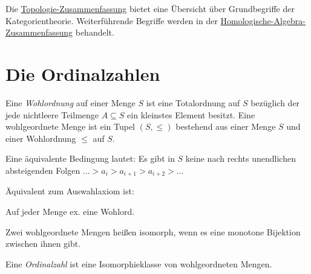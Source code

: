 \documentclass{cheat-sheet}
\begin{document}

\begin{bem}
  Die \href{http://timbaumann.info/uni-spicker/topo.pdf}{Topologie-Zusammenfassung} bietet eine Übersicht über Grundbegriffe der Kategorientheorie. Weiterführende Begriffe werden in der \href{http://timbaumann.info/uni-spicker/homoalg.pdf}{Homologische-Algebra-Zusammenfassung} behandelt.
\end{bem}


\section{Die Ordinalzahlen}

\begin{defn}
  Eine \emph{Wohlordnung} auf einer Menge $S$ ist eine Totalordnung auf $S$ bezüglich der jede nichtleere Teilmenge $A \subseteq S$ ein kleinstes Element besitzt. Eine wohlgeordnete Menge ist ein Tupel $(S, \leq)$ bestehend aus einer Menge $S$ und einer Wohlordnung $\leq$ auf $S$.
\end{defn}

\begin{bem}
  Eine äquivalente Bedingung lautet: Es gibt in $S$ keine nach rechts unendlichen absteigenden Folgen
  $\ldots > a_i > a_{i+1} > a_{i+2} > \ldots$
\end{bem}

\begin{bem}
  Äquivalent zum Auswahlaxiom ist:
\end{bem}

\begin{axiom}[Wohlordnungssatz]
  Auf jeder Menge ex. eine Wohlord.
\end{axiom}

\begin{defn}
  Zwei wohlgeordnete Mengen heißen isomorph, wenn es eine monotone Bijektion zwischen ihnen gibt.
\end{defn}


\begin{defn}
  Eine \emph{Ordinalzahl} ist eine Isomorphieklasse von wohlgeordneten Mengen.
\end{defn}
\end{document}
